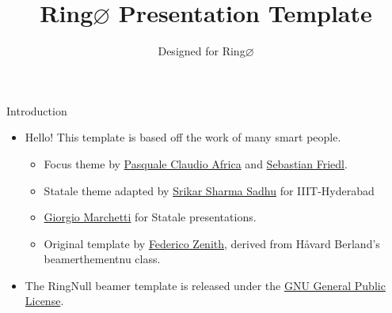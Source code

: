\documentclass[aspectratio=169,11pt]{beamer}
\title{Ring\texorpdfstring{$\varnothing$}{Null} Presentation Template}
\subtitle{Designed for Ring\texorpdfstring{$\varnothing$}{Null}}
\author{}
\begin{document}
\maketitle



\begin{frame}{Introduction}
    \begin{itemize}
        \item Hello! This template is based off the work of many smart people. 
        \begin{itemize}
          \item Focus theme by \href{mailto:pafrica@sissa.it}{Pasquale Claudio Africa} and \href{mailto:sfriedl@sissa.it}{Sebastian Friedl}.
          \item Statale theme adapted by \href{mailto:srikar.sadhu@research.iiit.ac.in}{Srikar Sharma Sadhu} for IIIT-Hyderabad
          \item \href{ciao@gio.im}{Giorgio Marchetti} for Statale presentations. 
          \item Original template by \href{federico.zenith@sintef.no}{Federico Zenith}, derived from Håvard Berland's beamerthementnu class.
        \end{itemize}
        \item The RingNull beamer template is released under the \href{http://www.gnu.org/licenses/}{GNU General Public License}.
    \end{itemize}
\end{frame}







\backmatter
\end{document}
